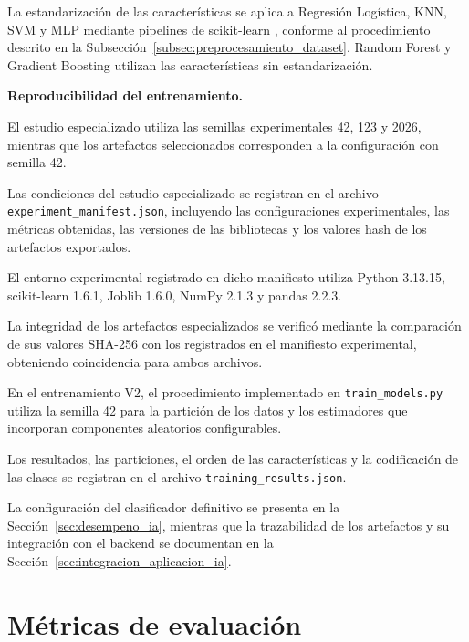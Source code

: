 \FloatBarrier

La estandarización de las características se aplica a Regresión Logística, KNN, SVM y MLP mediante pipelines de scikit-learn \parencite{pedregosa2011}, conforme al procedimiento descrito en la Subsección~\ref{subsec:preprocesamiento_dataset}. Random Forest y Gradient Boosting utilizan las características sin estandarización.

\textbf{Reproducibilidad del entrenamiento.}

El estudio especializado utiliza las semillas experimentales 42, 123 y 2026, mientras que los artefactos seleccionados corresponden a la configuración con semilla 42.

Las condiciones del estudio especializado se registran en el archivo \texttt{experiment\_manifest.json}, incluyendo las configuraciones experimentales, las métricas obtenidas, las versiones de las bibliotecas y los valores hash de los artefactos exportados.

El entorno experimental registrado en dicho manifiesto utiliza Python 3.13.15, scikit-learn 1.6.1, Joblib 1.6.0, NumPy 2.1.3 y pandas 2.2.3.

La integridad de los artefactos especializados se verificó mediante la comparación de sus valores SHA-256 con los registrados en el manifiesto experimental, obteniendo coincidencia para ambos archivos.

En el entrenamiento V2, el procedimiento implementado en \texttt{train\_models.py} utiliza la semilla 42 para la partición de los datos y los estimadores que incorporan componentes aleatorios configurables.

Los resultados, las particiones, el orden de las características y la codificación de las clases se registran en el archivo \texttt{training\_results.json}.

La configuración del clasificador definitivo se presenta en la Sección~\ref{sec:desempeno_ia}, mientras que la trazabilidad de los artefactos y su integración con el backend se documentan en la Sección~\ref{sec:integracion_aplicacion_ia}.

\FloatBarrier


\section{Métricas de evaluación}
\label{sec:metricas_ia}

